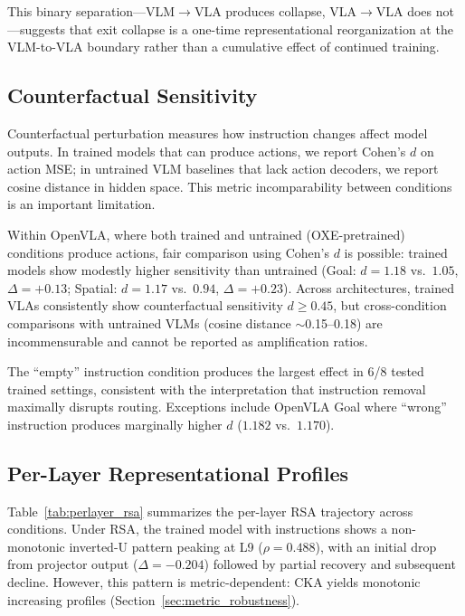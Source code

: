 \documentclass[10pt,letterpaper]{article}
\begin{document}
This binary separation---VLM$\to$VLA produces collapse, VLA$\to$VLA does not---suggests that exit collapse is a one-time representational reorganization at the VLM-to-VLA boundary rather than a cumulative effect of continued training.

\subsection{Counterfactual Sensitivity}

Counterfactual perturbation measures how instruction changes affect model outputs. In trained models that can produce actions, we report Cohen's $d$ on action MSE; in untrained VLM baselines that lack action decoders, we report cosine distance in hidden space. This metric incomparability between conditions is an important limitation.

Within OpenVLA, where both trained and untrained (OXE-pretrained) conditions produce actions, fair comparison using Cohen's $d$ is possible: trained models show modestly higher sensitivity than untrained (Goal: $d = 1.18$ vs.\ $1.05$, $\Delta = +0.13$; Spatial: $d = 1.17$ vs.\ $0.94$, $\Delta = +0.23$). Across architectures, trained VLAs consistently show counterfactual sensitivity $d \geq 0.45$, but cross-condition comparisons with untrained VLMs (cosine distance $\sim$0.15--0.18) are incommensurable and cannot be reported as amplification ratios.

The ``empty'' instruction condition produces the largest effect in 6/8 tested trained settings, consistent with the interpretation that instruction removal maximally disrupts routing. Exceptions include OpenVLA Goal where ``wrong'' instruction produces marginally higher $d$ ($1.182$ vs.\ $1.170$).

\subsection{Per-Layer Representational Profiles}

Table~\ref{tab:perlayer_rsa} summarizes the per-layer RSA trajectory across conditions. Under RSA, the trained model with instructions shows a non-monotonic inverted-U pattern peaking at L9 ($\rho = 0.488$), with an initial drop from projector output ($\Delta = -0.204$) followed by partial recovery and subsequent decline. However, this pattern is metric-dependent: CKA yields monotonic increasing profiles (Section~\ref{sec:metric_robustness}).
\end{document}
